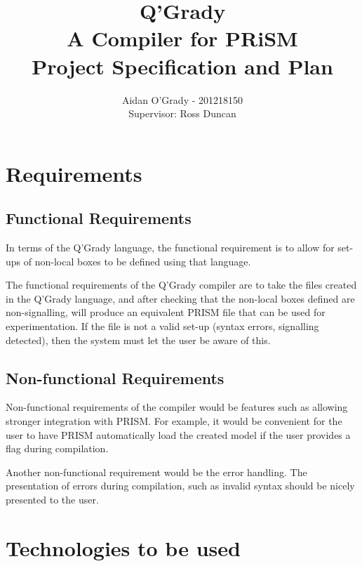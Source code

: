 \documentclass[11pt, a4paper]{article}
\begin{document}
\title{Q'Grady \\A Compiler for PRiSM \\
\large{Project Specification and Plan}}
\author{Aidan O'Grady - 201218150\\Supervisor: Ross Duncan}
\date{}
\maketitle

\section{Requirements} %
\label{sec:requirements}

\subsection{Functional Requirements} %
\label{sub:functional_requirements}
In terms of the Q'Grady language, the functional requirement is to allow for
set-ups of non-local boxes to be defined using that language.

The functional requirements of the Q'Grady compiler are to take the files
created in the Q'Grady language, and after checking that the non-local boxes
defined are non-signalling, will produce an equivalent PRISM file that can
be used for experimentation. If the file is not a valid set-up (syntax errors,
signalling detected), then the system must let the user be aware of this.

\subsection{Non-functional Requirements} %
\label{sub:non_functional_requirements}
Non-functional requirements of the compiler would be features such as allowing
stronger integration with PRISM. For example, it would be convenient for the
user to have PRISM automatically load the created model if the user provides
a flag during compilation.

Another non-functional requirement would be the error handling. The presentation
of errors during compilation, such as invalid syntax should be nicely presented
to the user.

\newpage
\section{Technologies to be used} %
\label{sec:technologies_to_be_used}
\end{document}
